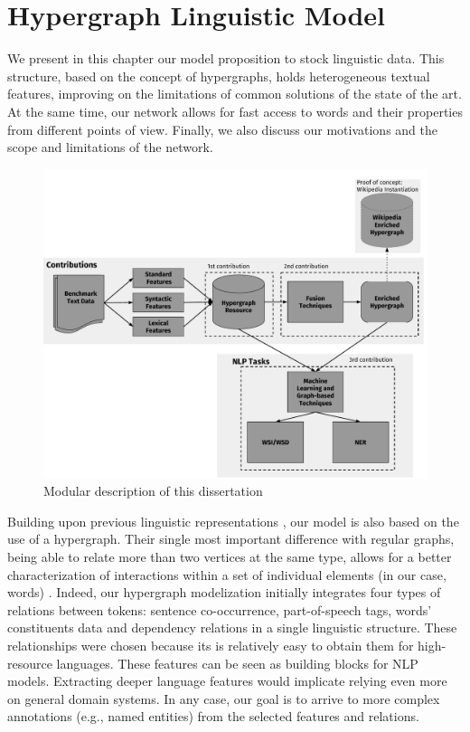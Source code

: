 \chapter{Hypergraph Linguistic Model}
\label{chap:ling_net}
\begin{abstractchap}
We present in this chapter our model proposition to stock linguistic data. This structure, based on the concept of hypergraphs, holds heterogeneous textual features, improving on the limitations of common solutions of the state of the art. At the same time, our network allows for fast access to words and their properties from different points of view. Finally, we also discuss our motivations and the scope and limitations of the network. 
\end{abstractchap}
\minitoc

\begin{figure}
\centering
\includegraphics[width=1\linewidth]{./images/Chapitre3/main_diag.pdf}
\caption{Modular description of this dissertation}
\label{fig:maindiag}
\end{figure}


Building upon previous linguistic representations \cite{2007.Klapaftis.UOY,2011.Haishan.AHypergraphbased,2014.Tao.Qian.LexicalChainHypergraphWSI}, our model is also based on the use of a hypergraph.
Their single most important difference with regular graphs, being able to relate more than two vertices at the same type, allows for a better characterization of interactions within a set of individual elements (in our case, words) \cite{heintz2014beyond}. Indeed, our hypergraph modelization initially integrates four types of relations between tokens: sentence co-occurrence, part-of-speech tags, words' constituents data and dependency relations in a single linguistic structure. These relationships were chosen because its is relatively easy to obtain them for high-resource languages. These features can be seen as building blocks for NLP models. Extracting deeper language features would implicate relying even more on general domain systems. In any case, our goal is to arrive to more complex annotations (e.g., named entities) from the selected features and relations.
 
